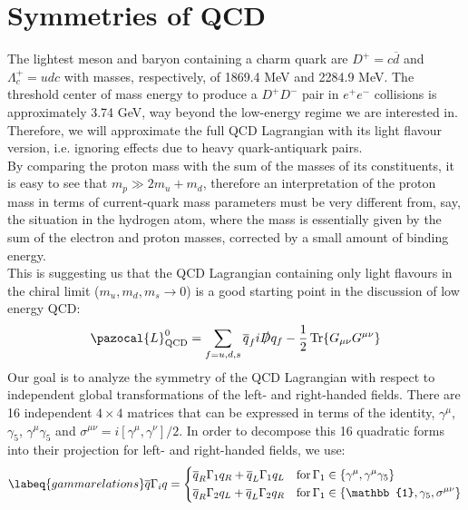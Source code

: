 \documentclass[../main.tex]{subfiles}
\begin{document}
\section{Symmetries of QCD}
The lightest meson and baryon containing a charm quark are $D^+=c\overline{d}$ and $\Lambda_c^+=udc$ with masses, respectively, of 1869.4 MeV and 2284.9 MeV. The threshold center of mass energy to produce a $D^+D^-$ pair in $e^+e^-$ collisions is approximately 3.74 GeV, way beyond the low-energy regime we are interested in. Therefore, we will approximate the full QCD Lagrangian with its light flavour version, i.e. ignoring effects due to heavy quark-antiquark pairs.\\
By comparing the proton mass with the sum of the masses of its constituents, it is easy to see that $m_p\gg2m_u+m_d$, therefore an interpretation of the proton mass in terms of current-quark
mass parameters must be very different from, say, the situation in the hydrogen atom, where the mass is essentially given by the sum of the electron
and proton masses, corrected by a small amount of binding energy.\\
This is suggesting us that the QCD Lagrangian containing only light flavours in the chiral limit ($m_u,m_d,m_s\to0$) is a good starting point in the discussion of low energy QCD:
\[
\pazocal{L}_{\text{QCD}}^0=\sum_{f=u,d,s}\overline{q}_fi\slashed{D}q_f-\frac{1}{2}\Tr{G_{\mu\nu}G^{\mu\nu}}
\]
Our goal is to analyze the symmetry of the QCD Lagrangian with respect to independent global transformations of the left- and right-handed fields. There are 16 independent $4\times4$ matrices that can be expressed in terms of the identity, $\gamma^\mu$, $\gamma_5$, $\gamma^\mu\gamma_5$ and $\sigma^{\mu\nu}=i[\gamma^\mu,\gamma^\nu]/2$. In order to decompose this 16 quadratic forms into their projection for left- and right-handed fields, we use:
\begin{equation}
\labeq{gammarelations}
\overline{q}\Gamma_iq=\left\{
\begin{aligned}
&\overline{q}_R\Gamma_1q_R+\overline{q}_L\Gamma_1q_L \quad \text{for}\,\Gamma_1\in\{\gamma^\mu,\gamma^\mu\gamma_5\}\\
&\overline{q}_R\Gamma_2q_L+\overline{q}_L\Gamma_2q_R \quad \text{for}\,\Gamma_1\in\{\mathbb{1},\gamma_5,\sigma^{\mu\nu}\}
\end{aligned}
\right.
\end{equation}
\end{document}
